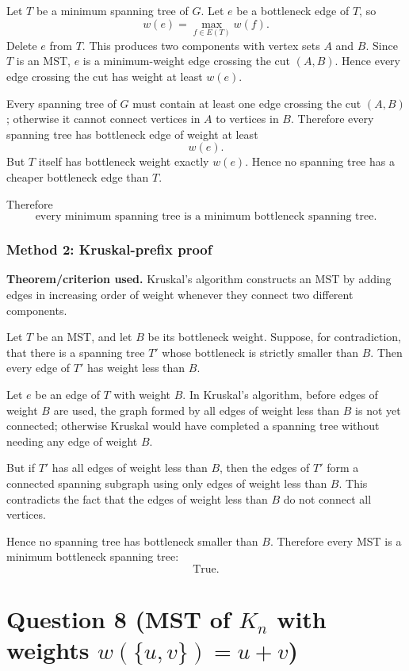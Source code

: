 \documentclass[12pt]{article}
\begin{document}
Let $T$ be a minimum spanning tree of $G$. Let $e$ be a bottleneck edge of $T$, so
\[
  w(e)=\max_{f\in E(T)}w(f).
\]
Delete $e$ from $T$. This produces two components with vertex sets $A$ and $B$. Since $T$ is an MST, $e$ is a minimum-weight edge crossing the cut $(A,B)$. Hence every edge crossing the cut has weight at least $w(e)$.

Every spanning tree of $G$ must contain at least one edge crossing the cut $(A,B)$; otherwise it cannot connect vertices in $A$ to vertices in $B$. Therefore every spanning tree has bottleneck edge of weight at least
\[
  w(e).
\]
But $T$ itself has bottleneck weight exactly $w(e)$. Hence no spanning tree has a cheaper bottleneck edge than $T$.

Therefore
\[
  \boxed{\text{every minimum spanning tree is a minimum bottleneck spanning tree}.}
\]

\subsubsection{Method 2: Kruskal-prefix proof}
\textbf{Theorem/criterion used.} Kruskal's algorithm constructs an MST by adding edges in increasing order of weight whenever they connect two different components.

Let $T$ be an MST, and let $B$ be its bottleneck weight. Suppose, for contradiction, that there is a spanning tree $T'$ whose bottleneck is strictly smaller than $B$. Then every edge of $T'$ has weight less than $B$.

Let $e$ be an edge of $T$ with weight $B$. In Kruskal's algorithm, before edges of weight $B$ are used, the graph formed by all edges of weight less than $B$ is not yet connected; otherwise Kruskal would have completed a spanning tree without needing any edge of weight $B$.

But if $T'$ has all edges of weight less than $B$, then the edges of $T'$ form a connected spanning subgraph using only edges of weight less than $B$. This contradicts the fact that the edges of weight less than $B$ do not connect all vertices.

Hence no spanning tree has bottleneck smaller than $B$. Therefore every MST is a minimum bottleneck spanning tree:
\[
  \boxed{\text{True}.}
\]

\newpage
\section{Question 8 (MST of $K_n$ with weights $w(\{u,v\})=u+v$)}
\end{document}
